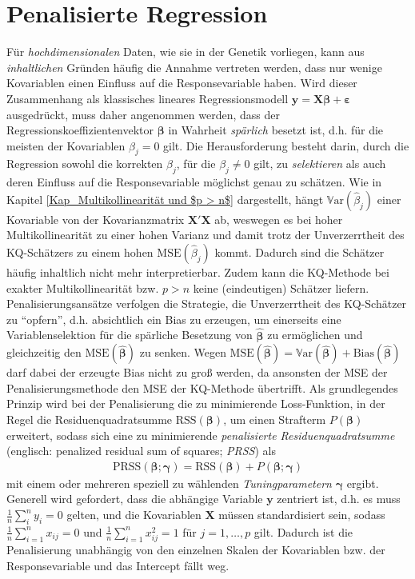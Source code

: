 \documentclass[12pt, a4paper]{report}\usepackage[]{graphicx}\usepackage[]{color}
\begin{document}
\section{Penalisierte Regression}\label{Kap_Penalisierte Regression}
Für \textit{hochdimensionalen} Daten, wie sie in der Genetik vorliegen, kann aus \textit{inhaltlichen} Gründen häufig die Annahme vertreten werden, dass nur wenige Kovariablen einen Einfluss auf die Responsevariable haben. Wird dieser Zusammenhang als klassisches lineares Regressionsmodell $\mathbf{y}=\mathbf{X}\boldsymbol{\beta}+\boldsymbol{\varepsilon}$ ausgedrückt, muss daher angenommen werden, dass der Regressionskoeffizientenvektor $\boldsymbol{\beta}$ in Wahrheit \textit{spärlich} besetzt ist, d.h. für die meisten der Kovariablen $\beta_j = 0$ gilt. Die Herausforderung besteht darin, durch die Regression sowohl die korrekten $\beta_j$, für die $\beta_j \neq 0$ gilt, zu \textit{selektieren} als auch deren Einfluss auf die Responsevariable möglichst genau zu schätzen. Wie in Kapitel \ref{Kap_Multikollinearität und $p > n$} dargestellt, hängt $\mathbb{V}\text{ar}(\hat{\beta}_j)$ einer Kovariable von der Kovarianzmatrix $\mathbf{X}'\mathbf{X}$ ab, weswegen es bei hoher Multikollinearität zu einer hohen Varianz und damit trotz der Unverzerrtheit des KQ-Schätzers zu einem hohen $\text{MSE}(\hat{\beta}_j)$ kommt. Dadurch sind die Schätzer häufig inhaltlich nicht mehr interpretierbar. Zudem kann die KQ-Methode bei exakter Multikollinearität bzw. $p > n$ keine (eindeutigen) Schätzer liefern.\\
Penalisierungsansätze verfolgen die Strategie, die Unverzerrtheit des KQ-Schätzer zu "`opfern"', d.h. absichtlich ein Bias zu erzeugen, um einerseits eine Variablenselektion für die spärliche Besetzung von $\boldsymbol{\hat{\beta}}$ zu ermöglichen und gleichzeitig den $\text{MSE}(\boldsymbol{\hat{\beta}})$ zu senken. Wegen $\text{MSE}(\boldsymbol{\hat{\beta}})=\mathbb{V}\text{ar}(\boldsymbol{\hat{\beta}})+ \text{Bias}(\boldsymbol{\hat{\beta}})$ darf dabei der erzeugte Bias nicht zu groß werden, da ansonsten der MSE der Penalisierungsmethode den MSE der KQ-Methode übertrifft. Als grundlegendes Prinzip wird bei der Penalisierung die zu minimierende Loss-Funktion, in der Regel die Residuenquadratsumme $\text{RSS}(\boldsymbol{\beta})$, um einen Strafterm $P(\boldsymbol{\beta})$ erweitert, sodass sich eine zu minimierende \textit{penalisierte Residuenquadratsumme} (englisch: penalized residual sum of squares; \textit{PRSS}) als  \begin{align}
\text{PRSS}(\boldsymbol{\beta};\boldsymbol{\gamma})=\text{RSS}(\boldsymbol{\beta}) + P(\boldsymbol{\beta}; \boldsymbol{\gamma})
\end{align} mit einem oder mehreren speziell zu wählenden \textit{Tuningparametern} $\boldsymbol{\gamma}$ ergibt. Generell wird gefordert, dass die abhängige Variable $\mathbf{y}$ zentriert ist, d.h. es muss $\frac{1}{n}\sum_{i}^{n}y_i =0$ gelten, und die Kovariablen $\mathbf{X}$ müssen standardisiert sein, sodass $\frac{1}{n}\sum_{i=1}^{n}x_{ij}=0$ und $\frac{1}{n}\sum_{i=1}^{n}x_{ij}^2=1$ für $j=1,\dots,p$ gilt. Dadurch ist die Penalisierung unabhängig von den einzelnen Skalen der Kovariablen bzw. der Responsevariable und das Intercept fällt weg.\\
\end{document}
